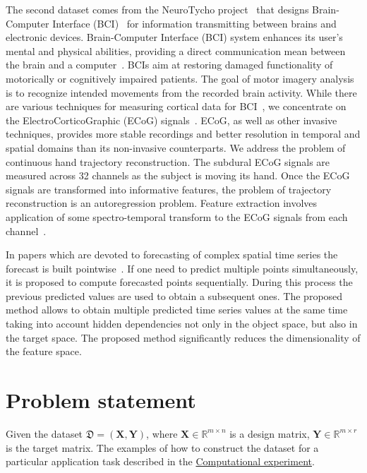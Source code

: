\documentclass[12pt,twoside]{article}
\newcommand{\bY}{\mathbf{Y}}
\newcommand{\bX}{\mathbf{X}}
\begin{document}
The second dataset comes from the NeuroTycho project~\cite{neurotycho} that designs Brain-Computer Interface (BCI)~\cite{millan2010combining,mason2007comprehensive} for information transmitting between brains and electronic devices.
Brain-Computer Interface (BCI) system enhances its user’s mental and physical abilities, providing a direct communication mean between the brain and a computer~\cite{millan2004brain}. 
BCIs aim at restoring damaged functionality of motorically or cognitively impaired patients.
The goal of motor imagery analysis is to recognize intended movements from the recorded brain activity. 
While there are various techniques for measuring cortical data for BCI~\cite{nicolas2012brain,amiri2013review}, we concentrate on the ElectroCorticoGraphic (ECoG) signals~\cite{eliseyev2016penalized}. 
ECoG, as well as other invasive techniques, provides more stable recordings and better resolution in temporal and spatial domains than its non-invasive counterparts.
We address the problem of continuous hand trajectory reconstruction. 
The subdural ECoG signals are measured across 32 channels as the subject is moving its hand.
Once the ECoG signals are transformed into informative features, the problem of trajectory reconstruction is an autoregression problem. 
Feature extraction involves application of some spectro-temporal transform to the ECoG signals from each channel~\cite{gasanov2017pls}.

In papers which are devoted to forecasting of complex spatial time series the forecast is built pointwise~\cite{box2015time,zhang2003time}.
If one need to predict multiple points simultaneously, it is proposed to compute forecasted points sequentially.
During this process the previous predicted values are used to obtain a subsequent ones.
The proposed method allows to obtain multiple predicted time series values at the same time taking into account hidden dependencies not only in the object space, but also in the target space.
The proposed method significantly reduces the dimensionality of the feature space.
 

\section{Problem statement}

Given the dataset $\mathfrak{D}= \left( \bX, \bY \right)$, where $\mathbf{X} \in \mathbb{R}^{m \times n}$ is a design matrix, $\mathbf{Y} \in \mathbb{R}^{m \times r}$is the target matrix. 
The examples of how to construct the dataset for a particular application task described in the \hyperref[sec:exper]{Computational experiment}.
\end{document}

